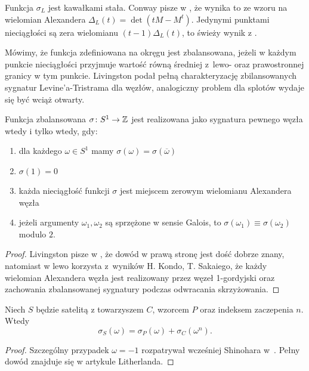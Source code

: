 Funkcja $\sigma_L$ jest kawałkami stała.
Conway pisze w \cite{conway19}, że wynika to ze wzoru na wielomian Alexandera $\Delta_L(t) = \det(tM - M^t)$.
Jedynymi punktami nieciągłości są zera wielomianu $(t-1)\Delta_L(t)$, to świeży wynik z \cite{gilmer16}.

Mówimy, że funkcja zdefiniowana na okręgu jest zbalansowana, jeżeli w każdym punkcie nieciągłości przyjmuje wartość równą średniej z~lewo- oraz prawostronnej granicy w tym punkcie.
Livingston podał pełną charakteryzację zbilansowanych sygnatur Levine'a-Tristrama dla węzłów, analogiczny problem dla splotów wydaje się być wciąż otwarty.

\begin{proposition}
    Funkcja zbalansowana $\sigma \colon S^1 \to \mathbb Z$ jest realizowana jako sygnatura pewnego węzła wtedy i tylko wtedy, gdy:
    \begin{enumerate}
        \item dla każdego $\omega \in S^1$ mamy $\sigma(\omega) = \sigma(\overline{\omega})$
        \item $\sigma(1) = 0$
        \item każda nieciągłość funkcji $\sigma$ jest miejscem zerowym wielomianu Alexandera węzła
        \item jeżeli argumenty $\omega_1, \omega_2$ są sprzężone w sensie Galois, to $\sigma(\omega_1) \equiv \sigma(\omega_2)$ modulo $2$.
    \end{enumerate}
\end{proposition}

\begin{proof}
    Livingston pisze w \cite{livingston18}, że dowód w prawą stronę jest dość dobrze znany, natomiast w lewo korzysta z~wyników H. Kondo, T. Sakaiego, że każdy wielomian Alexandera węzła jest realizowany przez węzeł 1-gordyjski oraz zachowania zbalansowanej sygnatury podczas odwracania skrzyżowania.
\end{proof}

\begin{proposition}
    Niech $S$ będzie satelitą z towarzyszem $C$, wzorcem $P$ oraz indeksem zaczepenia $n$.
    Wtedy
    \begin{equation}
        \sigma_S(\omega) = \sigma_P(\omega) + \sigma_C(\omega^n).
    \end{equation}
\end{proposition}

\begin{proof}
    Szczególny przypadek $\omega = -1$ rozpatrywał wcześniej Shinohara w~\cite{shinohara71}.
    Pełny dowód znajduje się w artykule \cite{litherland79} Litherlanda.
\end{proof}

